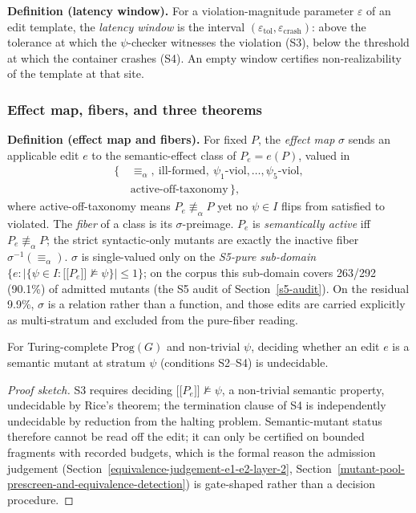 \documentclass[manuscript,screen,review]{acmart}
\begin{document}
\textbf{Definition (latency window).} For a violation-magnitude
parameter $\varepsilon$ of an edit template, the \emph{latency window}
is the interval $(\varepsilon_{\mathrm{tol}}, \varepsilon_{\mathrm{crash}})$:
above the tolerance at which the $\psi$-checker witnesses the violation
(S3), below the threshold at which the container crashes (S4). An empty
window certifies non-realizability of the template at that site.

\subsubsection{Effect map, fibers, and three theorems}\label{theory-fibers}

\textbf{Definition (effect map and fibers).} For fixed $P$, the
\emph{effect map} $\sigma$ sends an applicable edit $e$ to the
semantic-effect class of $P_e = e(P)$, valued in
\[
\begin{aligned}
\{\,&\equiv_\alpha,\ \text{ill-formed},\
      \psi_1\text{-viol}, \dots, \psi_5\text{-viol},\\
   &\text{active-off-taxonomy}\,\},
\end{aligned}
\]
where active-off-taxonomy means $P_e \not\equiv_\alpha P$ yet no
$\psi \in I$ flips from satisfied to violated. The \emph{fiber} of a
class is its $\sigma$-preimage. $P_e$ is \emph{semantically active} iff
$P_e \not\equiv_\alpha P$; the strict syntactic-only mutants are exactly
the inactive fiber $\sigma^{-1}(\equiv_\alpha)$. $\sigma$ is single-valued
only on the \emph{S5-pure sub-domain}
$\{e : |\{\psi \in I : \mathopen{\lbrack\!\lbrack} P_e \mathclose{\rbrack\!\rbrack} \not\models \psi\}| \le 1\}$;
on the corpus this sub-domain covers 263/292 (90.1\%) of admitted mutants
(the S5 audit of Section~\ref{s5-audit}). On the residual 9.9\%, $\sigma$
is a relation rather than a function, and those edits are carried
explicitly as multi-stratum and excluded from the pure-fiber reading.

\begin{theorem}\label{thm:undecidability}
For
Turing-complete $\mathrm{Prog}(G)$ and non-trivial $\psi$, deciding
whether an edit $e$ is a semantic mutant at stratum $\psi$
(conditions S2--S4) is undecidable.
\end{theorem}

\begin{proof}[Proof sketch]
S3 requires
deciding $\mathopen{\lbrack\!\lbrack} P_e \mathclose{\rbrack\!\rbrack} \not\models \psi$, a non-trivial
semantic property, undecidable by Rice's theorem; the termination clause
of S4 is independently undecidable by reduction from the halting
problem. Semantic-mutant status therefore cannot be read off the edit;
it can only be certified on bounded fragments with recorded budgets,
which is the formal reason the admission judgement (Section~\ref{equivalence-judgement-e1-e2-layer-2}, Section~\ref{mutant-pool-prescreen-and-equivalence-detection}) is
gate-shaped rather than a decision procedure.
\end{proof}
\end{document}

